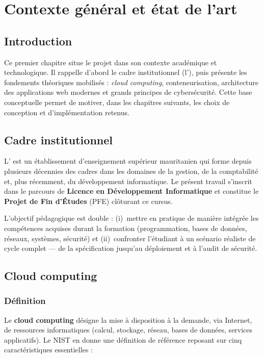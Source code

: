 \chapter{Contexte général et état de l'art}

\section*{Introduction}

Ce premier chapitre situe le projet dans son contexte académique et
technologique. Il rappelle d'abord le cadre institutionnel
(l'\Institute), puis présente les fondements théoriques mobilisés :
\emph{cloud computing}, conteneurisation, architecture des applications
web modernes et grands principes de cybersécurité. Cette base
conceptuelle permet de motiver, dans les chapitres suivants, les choix
de conception et d'implémentation retenus.

\section{Cadre institutionnel}

L'\textbf{\Institute} est un établissement d'enseignement supérieur
mauritanien qui forme depuis plusieurs décennies des cadres dans les
domaines de la gestion, de la comptabilité et, plus récemment, du
développement informatique. Le présent travail s'inscrit dans le
parcours de \textbf{Licence en Développement Informatique} et
constitue le \textbf{Projet de Fin d'Études} (PFE) clôturant ce cursus.

L'objectif pédagogique est double : (i)~mettre en pratique de manière
intégrée les compétences acquises durant la formation (programmation,
bases de données, réseaux, systèmes, sécurité) et (ii)~confronter
l'étudiant à un scénario réaliste de cycle complet --- de la
spécification jusqu'au déploiement et à l'audit de sécurité.

\section{Cloud computing}

\subsection{Définition}

Le \textbf{cloud computing} désigne la mise à disposition à la demande,
via Internet, de ressources informatiques (calcul, stockage, réseau,
bases de données, services applicatifs). Le NIST en donne une
définition de référence reposant sur cinq caractéristiques essentielles
\cite{nist-cloud} :

